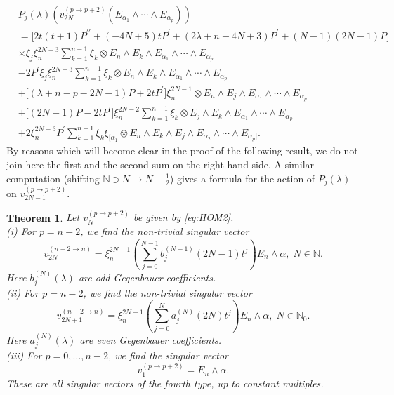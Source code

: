 \documentclass[a4paper,12pt,reqno]{amsart}
\newtheorem{theorem}{Theorem}
\numberwithin{theorem}{subsection}
\numberwithin{equation}{section}
\begin{document}
\begin{align*}
   & P_j(\lambda)(v_{2N}^{(p\to  p+2)}(E_{\alpha_1} \wedge \cdots \wedge E_{\alpha_p})) \\
   & = \big[2t(t\!+\!1) P^{\prime\prime} + (-4N\!+\!5)tP^\prime
   + (2\lambda\!+\!n\!-\!4N\!+\!3)P^\prime + (N\!-\!1)(2N\!-\!1)P\big] \\
   & \times \xi_j \xi_n^{2N-3}\sum_{k=1}^{n-1}\xi_{k}
       \otimes E_n\wedge E_k\wedge E_{\alpha_1}\wedge\cdots\wedge E_{\alpha_{p}}\\
   & - 2 P^\prime\xi_j \xi_n^{2N-3}\sum_{k=1}^{n-1}\xi_{k}
       \otimes E_n\wedge E_k\wedge E_{\alpha_1}\wedge\cdots\wedge E_{\alpha_{p}}\\
   & +\big[(\lambda\!+\!n\!-\!p\!-\!2N\!-\!1)P + 2t P^\prime\big]\xi_n^{2N-1}
       \otimes E_n\wedge E_j\wedge E_{\alpha_1}\wedge\cdots\wedge E_{\alpha_p}\\
   & +\big[(2N\!-\!1)P - 2tP^\prime\big] \xi_n^{2N-2}\sum_{k=1}^{n-1}\xi_{k}
       \otimes E_j\wedge E_k\wedge E_{\alpha_1}\wedge\cdots\wedge E_{\alpha_{p}}\\
   & + 2\xi_n^{2N-3} P^\prime\sum_{k=1}^{n-1}\xi_{k}\xi_{[\alpha_1}
       \otimes E_n\wedge E_k\wedge E_j\wedge  E_{\alpha_2}\wedge\cdots\wedge E_{\alpha_{p}]}.
\end{align*}
By reasons which will become clear in the proof of the following result, we do
not join here the first and the second sum on the right-hand side. A similar
computation (shifting ${\mathbb{N}}\ni N \to N-\frac 12$) gives a formula for the action
of $P_j(\lambda)$ on $v^{(p\to p+2)}_{2N-1}$.

\begin{theorem}\label{sv-fourth} Let $v^{(p\to p+2)}_N$ be given by \eqref{eq:HOM2}. \\
(i) For $p=n-2$, we find the non-trivial singular vector
\begin{equation}\label{sv-4-even}
   v^{(n-2\to n)}_{2N} = \xi_n^{2N-1} \left( \sum_{j=0}^{N-1} b_j^{(N-1)}(2N\!-\!1) t^j \right) E_n \wedge
   \alpha, \; N \in {\mathbb{N}}.
\end{equation}
Here $b_j^{(N)}(\lambda)$ are odd Gegenbauer coefficients. \\
(ii) For $p=n-2$, we find the non-trivial singular vector
\begin{equation}\label{sv-4-odd}
   v^{(n-2\to n)}_{2N+1} = \xi_n^{2N-1} \left( \sum_{j=0}^N a_j^{(N)}(2N) t^j \right) E_n \wedge
   \alpha, \; N \in {\mathbb{N}}_0.
\end{equation}
Here $a_j^{(N)}(\lambda)$ are even Gegenbauer coefficients. \\
(iii) For $p=0,\ldots,n-2$, we find the singular vector
\begin{equation}\label{sv-4-1}
   v_1^{(p\to p+2)} = E_n \wedge \alpha.
\end{equation}
These are all singular vectors of the fourth type, up to constant multiples.
\end{theorem}
\end{document}
